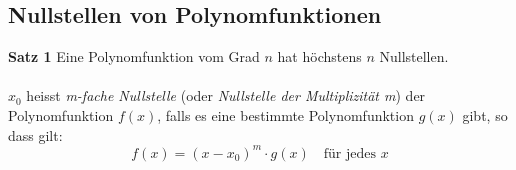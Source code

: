	\subsection{Nullstellen von Polynomfunktionen}
	\begin{minipage}{1\linewidth}
		\textbf{Satz 1} Eine Polynomfunktion vom Grad $n$ hat höchstens $n$ Nullstellen. \\
		\\
		$x_0$ heisst \textit{m-fache Nullstelle} (oder \textit{Nullstelle der Multiplizität m}) der
		Polynomfunktion $f(x)$, falls es eine bestimmte Polynomfunktion $g(x)$ gibt, so dass gilt:
	\begin{equation*}
		f(x) = (x - x_0)^m \cdot g(x) \quad \text{für jedes } x
	\end{equation*}
	\end{minipage}

